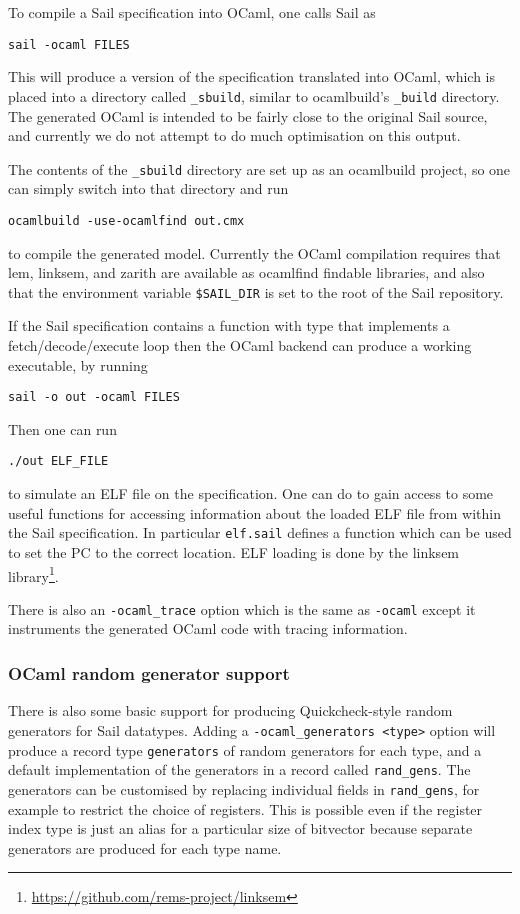 To compile a Sail specification into OCaml, one calls Sail as
\begin{verbatim}
sail -ocaml FILES
\end{verbatim}
This will produce a version of the specification translated into
OCaml, which is placed into a directory called \verb+_sbuild+, similar
to ocamlbuild's \verb+_build+ directory. The generated OCaml is
intended to be fairly close to the original Sail source, and currently
we do not attempt to do much optimisation on this output.

The contents of the \verb+_sbuild+ directory are set up as an
ocamlbuild project, so one can simply switch into that directory and run
\begin{verbatim}
ocamlbuild -use-ocamlfind out.cmx
\end{verbatim}
to compile the generated model. Currently the OCaml compilation
requires that lem, linksem, and zarith are available as ocamlfind
findable libraries, and also that the environment variable
\verb+$SAIL_DIR+ is set to the root of the Sail repository.

If the Sail specification contains a  function with type
 that implements a fetch/decode/execute loop then the
OCaml backend can produce a working executable, by running
\begin{verbatim}
sail -o out -ocaml FILES
\end{verbatim}
Then one can run
\begin{verbatim}
./out ELF_FILE
\end{verbatim}
to simulate an ELF file on the specification. One can do  to gain access to some useful functions for accessing
information about the loaded ELF file from within the Sail
specification. In particular \verb+elf.sail+ defines a function
 which can be used to set the PC to the
correct location. ELF loading is done by the linksem
library\footnote{\url{https://github.com/rems-project/linksem}}.

There is also an \verb+-ocaml_trace+ option which is the same as
\verb+-ocaml+ except it instruments the generated OCaml code with
tracing information.

\subsubsection{OCaml random generator support}

There is also some basic support for producing Quickcheck-style random
generators for Sail datatypes.  Adding a
\verb+-ocaml_generators <type>+ option will produce a record type
\verb+generators+ of random generators for each type, and a default
implementation of the generators in a record called \verb+rand_gens+.
The generators can be customised by replacing individual fields in
\verb+rand_gens+, for example to restrict the choice of registers.
This is possible even if the register index type is just an alias for
a particular size of bitvector because separate generators are
produced for each type name.

